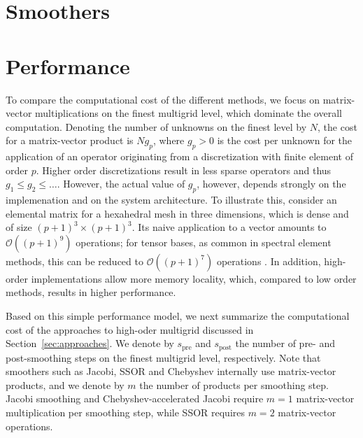 \documentclass[times]{nlaauth}
\begin{document}
\section{Smoothers}



\section{Performance}
To compare the computational cost of the different methods, we focus
on matrix-vector multiplications on the finest multigrid level, which
dominate the overall computation. Denoting the number of unknowns on
the finest level by $N$, the cost for a matrix-vector product is
$Ng_p$, where $g_p>0$ is the cost per unknown for the application of
an operator originating from a discretization with finite element of
order $p$. Higher order discretizations result in less sparse
operators and thus $g_1\le g_2\le \ldots$. However, the actual value
of $g_p$, however, depends strongly on the implemenation and on the
system architecture. To illustrate this, consider an elemental matrix
for a hexahedral mesh in three dimensions, which is dense and of size
$(p+1)^3\times (p+1)^3$. Its naive application to a vector amounts to
$\mathcal O((p+1)^9)$ operations; for tensor bases, as common in
spectral element methods, this can be reduced to $\mathcal O((p+1)^7)$
operations \cite{DevilleFischerMund02}. In addition, high-order
implementations allow more memory locality, which, compared to low
order methods, results in higher performance.

Based on this simple performance model, we next summarize the
computational cost of the approaches to high-oder multigrid discussed
in Section~\ref{sec:approaches}. We denote by $s_\text{pre}$ and
$s_\text{post}$ the number of pre- and post-smoothing steps on the
finest multigrid level, respectively. Note that smoothers such as
Jacobi, SSOR and Chebyshev internally use matrix-vector products, and
we denote by $m$ the number of products per smoothing step.  Jacobi
smoothing and Chebyshev-accelerated Jacobi require $m=1$ matrix-vector
multiplication per smoothing step, while SSOR requires $m=2$
matrix-vector operations.
\end{document}
